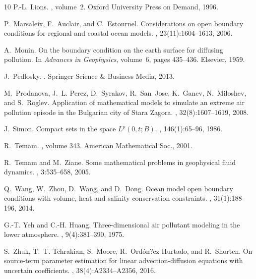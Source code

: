 \documentclass[11pt]{article}
\begin{document}
\begin{thebibliography}{10}
P.-L. Lions.
, volume~2.
\newblock Oxford University Press on Demand, 1996.

P.~Marsaleix, F.~Auclair, and C.~Estournel.
\newblock Considerations on open boundary conditions for regional and coastal ocean models.
, 23(11):1604--1613, 2006.

A.~Monin.
\newblock On the boundary condition on the earth surface for diffusing pollution.
\newblock In {\em Advances in Geophysics}, volume~6, pages 435--436. Elsevier, 1959.

J.~Pedlosky.
.
\newblock Springer Science \& Business Media, 2013.

M.~Prodanova, J.~L. Perez, D.~Syrakov, R.~San~Jose, K.~Ganev, N.~Miloshev, and S.~Roglev.
\newblock Application of mathematical models to simulate an extreme air pollution episode in the Bulgarian city of Stara Zagora.
, 32(8):1607--1619, 2008.

J.~Simon.
\newblock Compact sets in the space $L^p(0, t; B)$.
, 146(1):65--96, 1986.

R.~Temam.
, volume 343.
\newblock American Mathematical Soc., 2001.

R.~Temam and M.~Ziane.
\newblock Some mathematical problems in geophysical fluid dynamics.
, 3:535--658, 2005.

Q.~Wang, W.~Zhou, D.~Wang, and D.~Dong.
\newblock Ocean model open boundary conditions with volume, heat and salinity conservation constraints.
, 31(1):188--196, 2014.

G.-T. Yeh and C.-H. Huang.
\newblock Three-dimensional air pollutant modeling in the lower atmosphere.
, 9(4):381--390, 1975.

S.~Zhuk, T.~T. Tchrakian, S.~Moore, R.~Ord{\'o}n?ez-Hurtado, and R.~Shorten.
\newblock On source-term parameter estimation for linear advection-diffusion equations with uncertain coefficients.
, 38(4):A2334--A2356, 2016.

\end{thebibliography}
\end{document}
